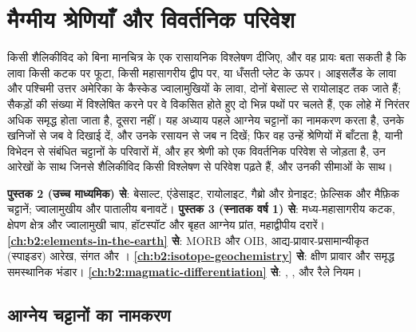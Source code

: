 \chapter{मैग्मीय श्रेणियाँ और विवर्तनिक परिवेश}\label{ch:b2:magmatic-series}

किसी शैलिकीविद को बिना मानचित्र के एक रासायनिक विश्लेषण दीजिए, और वह प्रायः बता सकती है कि
लावा किसी कटक पर फूटा, किसी महासागरीय द्वीप पर, या धँसती प्लेट के ऊपर। आइसलैंड के लावा
और पश्चिमी उत्तर अमेरिका के कैस्केड ज्वालामुखियों के लावा, दोनों
बेसाल्ट से रायोलाइट तक जाते हैं; सैकड़ों की संख्या में विश्लेषित करने पर वे विकसित होते हुए दो भिन्न पथों पर
चलते हैं, एक लोहे में निरंतर अधिक समृद्ध होता जाता है, दूसरा नहीं। यह अध्याय पहले
आग्नेय चट्टानों का नामकरण करता है, उनके खनिजों से जब वे दिखाई दें, और उनके
रसायन से जब न दिखें; फिर वह उन्हें श्रेणियों में बाँटता है, यानी विभेदन से संबंधित
चट्टानों के परिवारों में, और हर श्रेणी को एक विवर्तनिक परिवेश से जोड़ता है, उन
आरेखों के साथ जिनसे शैलिकीविद किसी विश्लेषण से परिवेश पढ़ते हैं, और उनकी सीमाओं के साथ।

\begin{recall}
\textbf{पुस्तक 2 (उच्च माध्यमिक) से}: बेसाल्ट, एंडेसाइट, रायोलाइट, गैब्रो और ग्रेनाइट;
फ़ेल्सिक और मैफ़िक चट्टानें; ज्वालामुखीय और पातालीय बनावटें।
\textbf{पुस्तक 3 (स्नातक वर्ष 1) से}: मध्य-महासागरीय कटक, क्षेपण क्षेत्र और ज्वालामुखी चाप, हॉटस्पॉट और बृहत
आग्नेय प्रांत, महाद्वीपीय दरारें। \textbf{\cref{ch:b2:elements-in-the-earth} से}:
MORB और OIB, आद्य-प्रावार-प्रसामान्यीकृत (स्पाइडर) आरेख, संगत और
। \textbf{\cref{ch:b2:isotope-geochemistry} से}: क्षीण
प्रावार और समृद्ध समस्थानिक भंडार। \textbf{\cref{ch:b2:magmatic-differentiation} से}:
, ,  और रैले नियम।
\end{recall}

\section{आग्नेय चट्टानों का नामकरण}\label{sec:b2:magmatic-series:naming}


